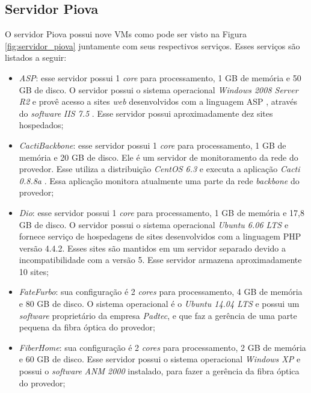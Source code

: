 \subsection{Servidor Piova}
\label{section:serv_piova}

O servidor Piova possui nove \ac{VM}s como pode ser visto na Figura \ref{fig:servidor_piova} juntamente com seus respectivos serviços. 
Esses serviços são listados a seguir:
\begin{itemize}
 \item \textit{ASP}: esse servidor possui 1 \textit{core} para processamento, 1 GB de memória e 50 GB de disco. O servidor possui o sistema 
 operacional \textit{Windows 2008 Server R2} e provê acesso a sites \textit{web} desenvolvidos com a linguagem \ac{ASP} \cite{asp}, através do
 \textit{software} \textit{\ac{IIS} 7.5} \cite{iis}. Esse servidor possui aproximadamente dez sites hospedados;
 
 \item \textit{CactiBackbone}: esse servidor possui 1 \textit{core} para processamento, 1 GB de memória e 20 GB de disco. Ele é um servidor
 de monitoramento da rede do provedor. Esse utiliza a distribuição \textit{CentOS 6.3} \cite{centos} e executa a aplicação \textit{Cacti 0.8.8a}
 \cite{cacti}. Essa aplicação monitora atualmente uma parte da rede \textit{backbone} do provedor;
 
 \item \textit{Dio}: esse servidor possui 1 \textit{core} para processamento, 1 GB de memória e 17,8 GB de disco. O servidor possui o sistema 
 operacional \textit{Ubuntu 6.06 \ac{LTS}} \cite{ubuntu} e fornece serviço de hospedagens de sites desenvolvidos com a linguagem \ac{PHP} 
 versão 4.4.2. Esses sites são mantidos em um servidor separado devido a incompatibilidade com a versão 5. Esse servidor armazena 
 aproximadamente 10 sites;
 
 \item \textit{FateFurbo}: sua configuração é 2 \textit{cores} para processamento, 4 GB de memória e 80 GB de disco. O sistema operacional é o 
 \textit{Ubuntu 14.04 \ac{LTS}} \cite{ubuntu} e possui um \textit{software} proprietário da empresa \textit{Padtec}, e que faz a gerência de uma 
 parte pequena da fibra óptica do provedor;
 
 \item \textit{FiberHome}: sua configuração é 2 \textit{cores} para processamento, 2 GB de memória e 60 GB de disco. Esse servidor possui o sistema 
 operacional \textit{Windows XP} e possui o \textit{software} \textit{ANM 2000} instalado, para fazer a gerência da fibra óptica do provedor;
 

\end{itemize}
